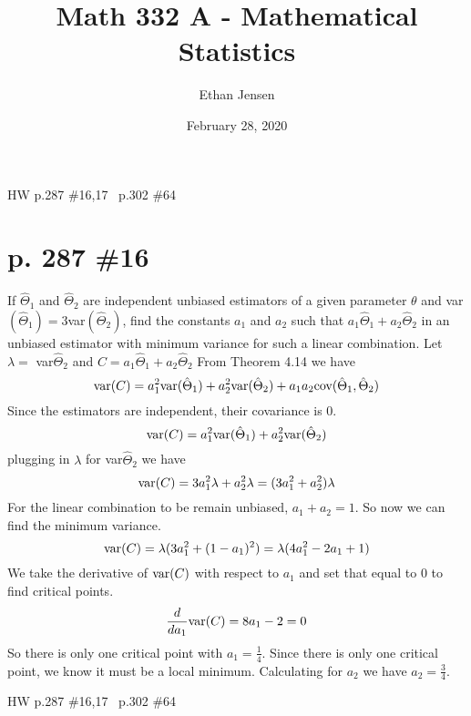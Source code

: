 \documentclass[12pt]{article}
\title{Math 332 A - Mathematical Statistics}
\author{Ethan Jensen}
\date{February 28, 2020}
\begin{document}
	\maketitle HW p.287 \#16,17 \ p.302 \#64
	\section[20pt]{p. 287 \#16}
	If \(\hat{\Theta}_1\) and \(\hat{\Theta}_2\) are independent unbiased estimators of a given parameter \(\theta\) and var\((\hat{\Theta}_1) = 3\)var\((\hat{\Theta}_2)\), find the constants \(a_1\) and \(a_2\) such that \(a_1\hat{\Theta}_1 + a_2\hat{\Theta}_2\) in an unbiased estimator with minimum variance for such a linear combination.
	\newline \newline
	Let \(\lambda=\) var\(\hat{\Theta}_2\) and \(C = a_1\hat{\Theta}_1 + a_2\hat{\Theta}_2\)
	\newline
	From Theorem 4.14 we have
	\[\textup{var}(C) = a_1^2\textup{var}(\hat{\Theta}_1) + a_2^2\textup{var}(\hat{\Theta}_2) + a_1a_2\textup{cov}(\hat{\Theta}_1,\hat{\Theta}_2)\]
	Since the estimators are independent, their covariance is 0.
	\[\textup{var}(C) = a_1^2\textup{var}(\hat{\Theta}_1) + a_2^2\textup{var}(\hat{\Theta}_2)\]
	plugging in \(\lambda\) for var\(\hat{\Theta}_2\) we have
		\[\textup{var}(C) = 3a_1^2\lambda + a_2^2\lambda = (3a_1^2 + a_2^2)\lambda\]
	For the linear combination to be remain unbiased, \(a_1 + a_2 = 1\). \newline
	So now we can find the minimum variance.
	\[\textup{var}(C) =\lambda(3a_1^2 + (1-a_1)^2) = \lambda(4a_1^2 -2a_1+1)\]
	We take the derivative of \(\textup{var}(C)\) with respect to \(a_1\) and set that equal to 0 to find critical points.
	\[\frac{d}{da_1}\textup{var}(C) = 8a_1 - 2 = 0\]
	So there is only one critical point with \(a_1 = \frac{1}{4}\).
	Since there is only one critical point, we know it must be a local minimum.
	\newline
	Calculating for \(a_2\) we have \(a_2 = \frac{3}{4}\).
	\newline
	\newpage
	\maketitle HW p.287 \#16,17 \ p.302 \#64
\end{document}
